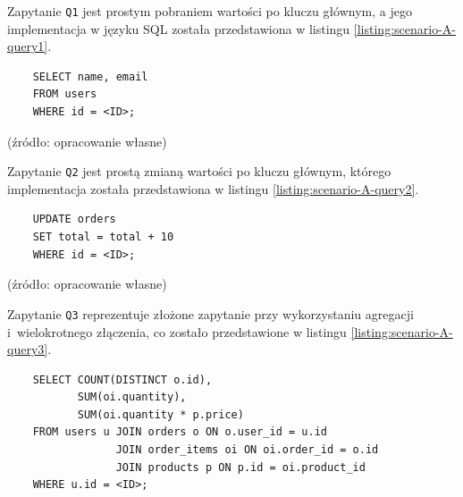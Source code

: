 \newpage
\noindent
Zapytanie \texttt{Q1} jest prostym pobraniem wartości po kluczu głównym, a jego implementacja w języku SQL została przedstawiona w listingu \ref{listing:scenario-A-query1}.

\begin{listing}[!ht]
    \begin{verbatim}
    SELECT name, email
    FROM users
    WHERE id = <ID>;
    \end{verbatim}
    \vspace{-10pt}
    \caption{Zapytanie \texttt{Q1} w języku SQL wykorzystane w ramach scenariusza $\mathcal{A}$}
    \label{listing:scenario-A-query1}
\end{listing}

\vspace{-20pt}
\begin{center}
    \small{(źródło: opracowanie własne)}
\end{center}

\noindent
Zapytanie \texttt{Q2} jest prostą zmianą wartości po kluczu głównym, którego implementacja została przedstawiona w listingu \ref{listing:scenario-A-query2}.

\begin{listing}[!ht]
    \begin{verbatim}
    UPDATE orders
    SET total = total + 10
    WHERE id = <ID>;
    \end{verbatim}
    \vspace{-10pt}
    \caption{Zapytanie \texttt{Q2} w języku SQL wykorzystane w ramach scenariusza $\mathcal{A}$}
    \label{listing:scenario-A-query2}
\end{listing}

\vspace{-20pt}
\begin{center}
    \small{(źródło: opracowanie własne)}
\end{center}

\noindent
Zapytanie \texttt{Q3} reprezentuje złożone zapytanie przy wykorzystaniu agregacji i~wielokrotnego złączenia, co zostało przedstawione w listingu \ref{listing:scenario-A-query3}.

\begin{listing}[!ht]
    \begin{verbatim}
    SELECT COUNT(DISTINCT o.id),
           SUM(oi.quantity),
           SUM(oi.quantity * p.price)
    FROM users u JOIN orders o ON o.user_id = u.id
                 JOIN order_items oi ON oi.order_id = o.id
                 JOIN products p ON p.id = oi.product_id
    WHERE u.id = <ID>;
    \end{verbatim}
    \vspace{-10pt}
    \caption{Zapytanie \texttt{Q3} w języku SQL wykorzystane w ramach scenariusza $\mathcal{A}$}
    \label{listing:scenario-A-query3}
\end{listing}

